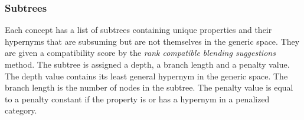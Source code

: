 \subsubsection{Subtrees}
Each concept has a list of subtrees containing unique properties and their hypernyms that are subsuming but are not themselves in the generic space. They are given a compatibility score by the \emph{rank compatible blending suggestions} method. The subtree is assigned a depth, a branch length and a penalty value. The depth value contains its least general hypernym in the generic space.
The branch length is the number of nodes in the subtree. The penalty value is equal to a penalty constant if the property is or has a hypernym in a penalized category.

